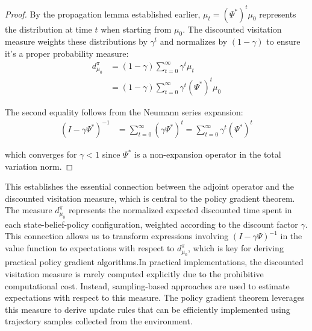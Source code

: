 \begin{proof}
    By the propagation lemma established earlier,
    $\mu_{t} = (\Psi^{*})^{t}\mu_{0}$ represents the distribution at time $t$ when
    starting from $\mu_{0}$. The discounted visitation measure weights these distributions
    by $\gamma^{t}$ and normalizes by $(1-\gamma)$ to ensure it's a proper probability
    measure:
    \begin{align}
        d^{\pi}_{\mu_0} & = (1-\gamma) \sum_{t=0}^{\infty}\gamma^{t} \mu_{t}                \\
                        & = (1-\gamma) \sum_{t=0}^{\infty}\gamma^{t} (\Psi^{*})^{t} \mu_{0}
    \end{align}

    The second equality follows from the Neumann series expansion:
    \begin{align}
        (I - \gamma\Psi^{*})^{-1} & = \sum_{t=0}^{\infty}(\gamma\Psi^{*})^{t} = \sum_{t=0}^{\infty}\gamma^{t} (\Psi^{*})^{t}
    \end{align}

    which converges for $\gamma < 1$ since $\Psi^{*}$ is a non-expansion operator in
    the total variation norm.
\end{proof}This establishes the essential connection between the adjoint operator
and the discounted visitation measure, which is central to the policy gradient
theorem. The measure $d^{\pi}_{\mu_0}$ represents the normalized expected discounted
time spent in each state-belief-policy configuration, weighted according to the
discount factor $\gamma$. This connection allows us to transform expressions involving
$(I - \gamma\Psi)^{-1}$ in the value function to expectations with respect to $d^{\pi}
        _{\mu_0}$, which is key for deriving practical policy gradient algorithms.In
practical implementations, the discounted visitation measure is rarely computed explicitly
due to the prohibitive computational cost. Instead, sampling-based approaches are
used to estimate expectations with respect to this measure. The policy gradient
theorem leverages this measure to derive update rules that can be efficiently
implemented using trajectory samples collected from the environment.

